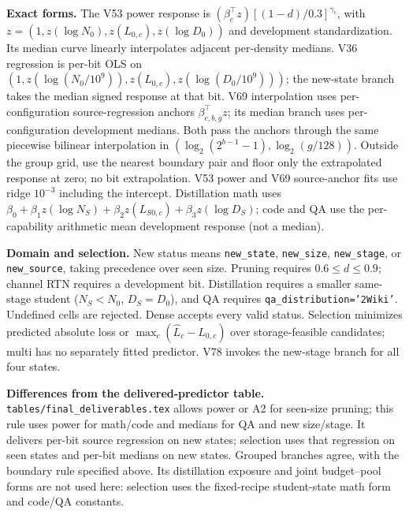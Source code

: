 \par\noindent\textbf{Exact forms.} The V53 power response is $(\beta_c^\top z)[(1-d)/0.3]^{\gamma_c}$, with $z=(1,\allowbreak z(\log N_0),\allowbreak z(L_{0,c}),\allowbreak z(\log D_0))$ and development standardization. Its median curve linearly interpolates adjacent per-density medians. V36 regression is per-bit OLS on $(1,\allowbreak z(\log(N_0/10^9)),\allowbreak z(L_{0,c}),\allowbreak z(\log(D_0/10^9)))$; the new-state branch takes the median signed response at that bit. V69 interpolation uses per-configuration source-regression anchors $\beta_{c,b,g}^\top z$; its median branch uses per-configuration development medians. Both pass the anchors through the same piecewise bilinear interpolation in $(\log_2(2^{b-1}-1),\log_2(g/128))$. Outside the group grid, use the nearest boundary pair and floor only the extrapolated response at zero; no bit extrapolation. V53 power and V69 source-anchor fits use ridge $10^{-3}$ including the intercept. Distillation math uses $\beta_0+\beta_1z(\log N_S)+\beta_2z(L_{S0,c})+\beta_3z(\log D_S)$; code and QA use the per-capability arithmetic mean development response (not a median).
\par\noindent\textbf{Domain and selection.} New status means \texttt{new\_state}, \texttt{new\_size}, \texttt{new\_stage}, or \texttt{new\_source}, taking precedence over seen size. Pruning requires $0.6\le d\le0.9$; channel RTN requires a development bit. Distillation requires a smaller same-stage student ($N_S<N_0$, $D_S=D_0$), and QA requires \texttt{qa\_distribution='2Wiki'}. Undefined cells are rejected. Dense accepts every valid status. Selection minimizes predicted absolute loss or $\max_c(\widehat L_c-L_{0,c})$ over storage-feasible candidates; multi has no separately fitted predictor. V78 invokes the new-stage branch for all four states.
\par\noindent\textbf{Differences from the delivered-predictor table.} \texttt{tables/final\_deliverables.tex} allows power or A2 for seen-size pruning; this rule uses power for math/code and medians for QA and new size/stage. It delivers per-bit source regression on new states; selection uses that regression on seen states and per-bit medians on new states. Grouped branches agree, with the boundary rule specified above. Its distillation exposure and joint budget--pool forms are not used here: selection uses the fixed-recipe student-state math form and code/QA constants.
\endgroup
